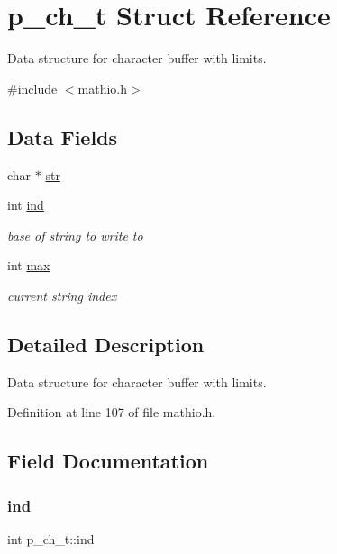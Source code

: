 \hypertarget{structp__ch__t}{}\section{p\+\_\+ch\+\_\+t Struct Reference}
\label{structp__ch__t}


Data structure for character buffer with limits.  




{\ttfamily \#include $<$mathio.\+h$>$}

\subsection*{Data Fields}
\begin{DoxyCompactItemize}
\item 
char $\ast$ \hyperlink{structp__ch__t_aa3c8616342a2717bc714bf1b6d00516f}{str}
\item 
int \hyperlink{structp__ch__t_a9d6834d749cd9232a16cb20b598fe90d}{ind}
\begin{DoxyCompactList}\small\item\em base of string to write to \end{DoxyCompactList}\item 
int \hyperlink{structp__ch__t_a0dee9f28e498d427e53051b7e1846d34}{max}
\begin{DoxyCompactList}\small\item\em current string index \end{DoxyCompactList}\end{DoxyCompactItemize}


\subsection{Detailed Description}
Data structure for character buffer with limits. 

Definition at line 107 of file mathio.\+h.



\subsection{Field Documentation}
\mbox{\label{structp__ch__t_a9d6834d749cd9232a16cb20b598fe90d}} 
\subsubsection{\texorpdfstring{ind}{ind}}
{\footnotesize\ttfamily int p\+\_\+ch\+\_\+t\+::ind}



